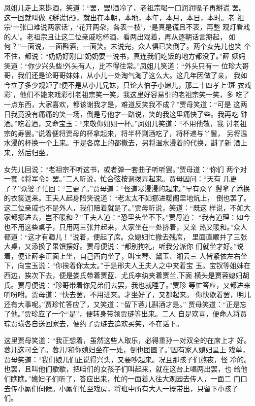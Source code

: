 凤姐儿走上来斟酒，笑道：“罢，罢!酒冷了，老祖宗喝一口润润嗓子再掰谎
罢。这一回就叫做《掰谎记》，就出在本朝，本地，本年，本月，本日，本时。老
祖宗‘一张口难说两家话’，‘花开两朵，各表一枝’，‘是真是谎且不表，再整
观灯看戏的人’。老祖宗且让这二位亲戚吃杯酒、看两出戏着，再从逐朝话言掰起，
如何？”一面说，一面斟酒，一面笑。未说完，众人俱已笑倒了。两个女先儿也笑
个不住，都说：“奶奶好刚口!奶奶要一说书，真连我们吃饭的地方都没了。”薛
姨妈笑道：“你少兴头些!外头有人，比不得往常。”凤姐儿笑道：“外头只有一
位珍大哥哥，我们还是论哥哥妹妹，从小儿一处淘气淘了这么大。这几年因做了亲，
我如今立了多少规矩了!便不是从小儿兄妹，只论大伯子小婶儿，那二十四孝上‘斑
衣戏彩’，他们不能来戏彩引老祖宗笑一笑，我这里好容易引的老祖宗笑一笑，多
吃了一点东西，大家喜欢，都该谢我才是，难道反笑我不成？”贾母笑道：“可是
这两日我竟没有痛痛的笑一场，倒是亏他才一路说，笑的我这里痛快了些。我再吃
钟酒。”吃着酒，又命宝玉：“来敬你姐姐一杯。”凤姐儿笑道：“不用他敬，我
讨老祖宗的寿罢。”说着便将贾母的杯拿起来，将半杯剩酒吃了，将杯递与丫鬟，
另将温水浸的杯换一个上来。于是各席上的都撤去，另将温水浸着的代换，斟了新
酒上来，然后归坐。

女先儿回说：“老祖宗不听这书，或者弹一套曲子听听罢。”贾母道：“你们
两个对一套《将军令》罢。”二人听说，忙合弦按调拨弄起来。贾母因问：“天有
几更了？”众婆子忙回：“三更了。”贾母道：“怪道寒浸浸的起来。”早有众丫
鬟拿了添换的衣裳送来。王夫人起身陪笑说道：“老太太不如挪进暖阁里地炕上，
倒也罢了。这二位亲戚也不是外人，我们陪着就是了。”贾母听说，笑道：“既这
样说，不如大家都挪进去，岂不暖和？”王夫人道：“恐里头坐不下。”贾母道：
“我有道理：如今也不用这些桌子，只用两三张并起来，大家坐在一处挤着，又亲
热又暖和。”众人都道：“这才有趣儿！”说着，便起了席。众媳妇忙撤去残席，
里面直顺并了三张大桌，又添换了果馔摆好。贾母便说：“都别拘礼，听我分派你
们就坐才好。”说着，便让薛李正面上坐，自己西向坐了，叫宝琴、黛玉、湘云三
人皆紧依左右坐下，向宝玉说：“你挨着你太太。”于是邢夫人王夫人之中夹着宝
玉。宝钗等姐妹在西边，挨次下去，便是娄氏带着贾蓝、尤氏李纨夹着贾兰,下面
横头是贾蓉媳妇胡氏。贾母便说：“珍哥带着你兄弟们去罢，我也就睡了。”贾珍
等忙答应，又都进来听吩咐。贾母道：“快去罢，不用进来。才坐好了，又都起来。
你快歇着罢，明儿还有大事呢。”贾珍忙答应了，又笑道：“留下蓉儿斟酒才是。”
贾母笑道：“正是忘了他。”贾珍应了一个“是”，便转身带领贾琏等出来。二人
自是欢喜，便命人将贾琮贾璜各自送回家去，便约了贾琏去追欢买笑，不在话下。

这里贾母笑道：“我正想着，虽然这些人取乐，必得重孙一对双全的在席上才
好。蓉儿这可全了。蓉儿!和你媳妇坐在一处，倒也团圆了。”因有家人媳妇呈上
戏单，贾母笑道：“我们娘儿们正说得兴头，又要吵起来。况且那孩子们熬夜，怪
冷的。也罢，且叫他们歇歇，把咱们的女孩子们叫起来，就在这台上唱两出罢，也
给他们瞧瞧。”媳妇子们听了，答应出来，忙的一面着人往大观园去传人，一面二
门口去传小厮们伺候。小厮们忙至戏房，将班中所有大人一概带出，只留下小孩子
们。


